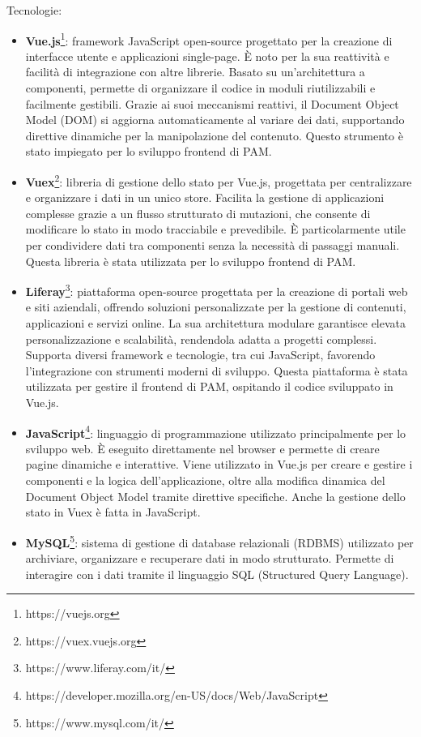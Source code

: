Tecnologie:
\begin{itemize}
    \item \textbf{Vue.js}\footnote{https://vuejs.org}: framework JavaScript open-source progettato per la creazione di interfacce utente e applicazioni single-page. È noto per la sua reattività e
    facilità di integrazione con altre librerie. Basato su un’architettura a componenti, permette di organizzare il codice in moduli riutilizzabili e facilmente
    gestibili. Grazie ai suoi meccanismi reattivi, il Document Object Model (DOM) si aggiorna automaticamente al variare dei dati, supportando direttive dinamiche
    per la manipolazione del contenuto. Questo strumento è stato impiegato per lo sviluppo frontend di \ac{PAM}.
    \item \textbf{Vuex}\footnote{https://vuex.vuejs.org}: libreria di gestione dello stato per Vue.js, progettata per centralizzare e organizzare i dati in un unico store. Facilita la gestione di
    applicazioni complesse grazie a un flusso strutturato di mutazioni, che consente di modificare lo stato in modo tracciabile e prevedibile. È particolarmente utile
    per condividere dati tra componenti senza la necessità di passaggi manuali. Questa libreria è stata utilizzata per lo sviluppo frontend di \ac{PAM}.
    \item \textbf{Liferay}\footnote{https://www.liferay.com/it/}: piattaforma open-source progettata per la creazione di portali web e siti aziendali, offrendo soluzioni personalizzate per la gestione di
    contenuti, applicazioni e servizi online. La sua architettura modulare garantisce elevata personalizzazione e scalabilità, rendendola adatta a progetti complessi.
    Supporta diversi framework e tecnologie, tra cui JavaScript, favorendo l’integrazione con strumenti moderni di sviluppo. Questa piattaforma è stata utilizzata per
    gestire il frontend di \ac{PAM}, ospitando il codice sviluppato in Vue.js.
    \item \textbf{JavaScript}\footnote{https://developer.mozilla.org/en-US/docs/Web/JavaScript}: linguaggio di programmazione utilizzato principalmente per lo sviluppo web. È eseguito direttamente nel browser e permette di creare
    pagine dinamiche e interattive. Viene utilizzato in Vue.js per creare e gestire i componenti e la logica dell'applicazione, oltre alla modifica dinamica del
    Document Object Model tramite direttive specifiche. Anche la gestione dello stato in Vuex è fatta in JavaScript.
    \item \textbf{MySQL}\footnote{https://www.mysql.com/it/}: sistema di gestione di database relazionali (RDBMS) utilizzato per archiviare, organizzare e recuperare dati in modo strutturato. Permette
    di interagire con i dati tramite il linguaggio SQL (Structured Query Language).
\end{itemize}